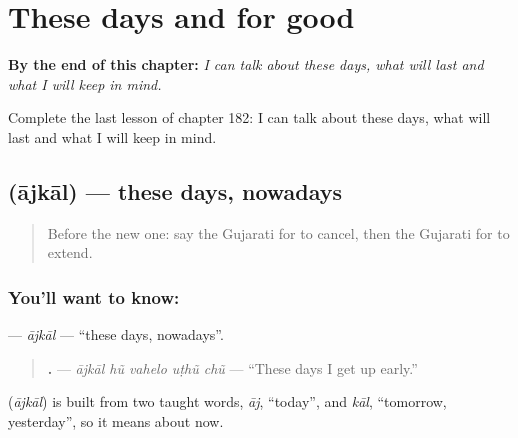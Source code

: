 
\chapter{These days and for good}
\label{ch:gu-these-days-and-for-good}

\begin{chapteropening}
\textbf{By the end of this chapter:} \emph{I can talk about these days, what will last and what I will keep in mind.}

Complete the last lesson of chapter 182: I can talk about these days, what will last and what I will keep in mind.
\end{chapteropening}

\section[\texorpdfstring{\gu{આજકાલ} (ājkāl)}{આજકાલ (ājkāl)}]{ (ājkāl) — these days, nowadays}

\label{lesson:GU-C182-ajkal}



\begin{quote}
Before the new one: say the Gujarati for to cancel, then the Gujarati for to extend.
\end{quote}

\subsection*{You'll want to know: }
\textbf{} — \emph{ājkāl} — \textquotedblleft{}these days, nowadays\textquotedblright{}.

\begin{quote}
\textbf{    .} — \emph{ājkāl hũ vahelo uṭhũ chũ} — \textquotedblleft{}These days I get up early.\textquotedblright{}
\end{quote}

\begin{cousinweb}
\textbf{} (\emph{ājkāl}) is built from two taught words, \emph{āj}, \textquotedblleft{}today\textquotedblright{}, and \emph{kāl}, \textquotedblleft{}tomorrow, yesterday\textquotedblright{}, so it means about now.
\end{cousinweb}

